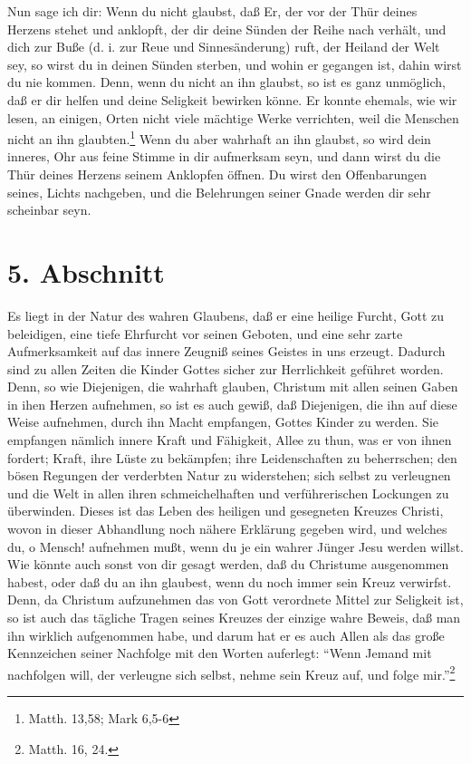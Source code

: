 Nun sage ich dir: Wenn du nicht glaubst, daß Er, der vor der Thür deines Herzens stehet und anklopft, der dir deine Sünden der Reihe nach verhält, und dich zur Buße (d. i. zur Reue und Sinnesänderung) ruft, der Heiland der Welt sey, so wirst du in deinen Sünden sterben, und wohin er gegangen ist, dahin wirst du nie kommen. Denn, wenn du nicht an ihn glaubst, so ist es ganz unmöglich, daß er dir helfen und deine Seligkeit bewirken könne. Er konnte ehemals, wie wir lesen, an einigen, Orten nicht viele mächtige Werke verrichten, weil die Menschen nicht an ihn glaubten.\footnote{Matth. 13,58; Mark 6,5-6} Wenn du aber wahrhaft an ihn glaubst, so wird dein inneres, Ohr aus feine Stimme in dir aufmerksam seyn, und dann wirst du die Thür deines Herzens seinem Anklopfen öffnen. Du wirst den Offenbarungen seines, Lichts nachgeben, und die Belehrungen seiner Gnade werden dir sehr scheinbar seyn.

\section{5. Abschnitt}

Es liegt in der Natur des wahren Glaubens, daß er eine heilige Furcht, Gott zu beleidigen, eine tiefe Ehrfurcht vor seinen Geboten, und eine sehr zarte Aufmerksamkeit auf das innere Zeugniß seines Geistes in uns erzeugt. Dadurch sind zu allen Zeiten die Kinder Gottes sicher zur Herrlichkeit geführet worden. Denn, so wie Diejenigen, die wahrhaft glauben, Christum mit allen seinen Gaben in ihen Herzen aufnehmen, so ist es auch gewiß, daß Diejenigen, die ihn auf diese Weise aufnehmen, durch ihn Macht empfangen, Gottes Kinder zu werden. Sie empfangen nämlich innere Kraft und Fähigkeit, Allee zu thun, was er von ihnen fordert; Kraft, ihre Lüste zu bekämpfen; ihre Leidenschaften zu beherrschen; den bösen Regungen der verderbten Natur zu widerstehen; sich selbst zu verleugnen und die Welt in allen ihren schmeichelhaften und verführerischen Lockungen zu überwinden. Dieses ist das Leben des heiligen und gesegneten Kreuzes Christi, wovon in dieser Abhandlung noch nähere Erklärung gegeben wird, und welches du, o Mensch! aufnehmen mußt, wenn du je ein wahrer Jünger Jesu werden willst. Wie könnte auch sonst von dir gesagt werden, daß du Christume ausgenommen habest, oder daß du an ihn glaubest, wenn du noch immer sein Kreuz verwirfst. Denn, da Christum aufzunehmen das von Gott verordnete Mittel zur Seligkeit ist, so ist auch das tägliche Tragen seines Kreuzes der einzige wahre Beweis, daß man ihn wirklich aufgenommen habe, und darum hat er es auch Allen als das große Kennzeichen seiner Nachfolge mit den Worten auferlegt: "`Wenn Jemand mit nachfolgen will, der verleugne sich selbst, nehme sein Kreuz auf, und folge mir."'\footnote{Matth. 16, 24.}

